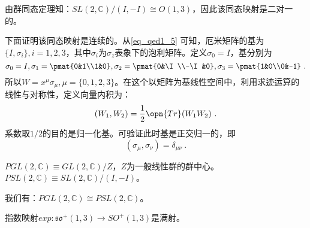 由群同态定理知：$SL(2,\mathbb C)/(I,-I)\cong O(1,3)$，因此该同态映射是二对一的。

下面证明该同态映射是连续的。从\autoref{eq_qed1_5} 可知，厄米矩阵的基为$\{I,\sigma_i\},i=1,2,3$，其中$\sigma_i$为$\sigma_z$表象下的泡利矩阵。定义$\sigma_0=I$，基分别为
\begin{equation}
\sigma_0=I,\sigma_1=\pmat{0&1\\1&0},\sigma_2=\pmat{0&\I\\-\I&0},\sigma_3=\pmat{1&0\\0&-1}~.
\end{equation}
所以$W=x^{\mu}\sigma_{\mu},\mu=\{0,1,2,3\}$。在这个以矩阵为基线性空间中，利用求迹运算的线性与对称性，定义向量内积为：
\begin{equation}
(W_1,W_2)=\frac{1}{2}\opn{Tr}(W_1W_2)~.
\end{equation}
系数取$1/2$的目的是归一化基。可验证此时基是正交归一的，即
\begin{equation}
(\sigma_{\mu},\sigma_{\nu})=\delta_{\mu\nu}~.
\end{equation}




\begin{lemma}{}
$PGL(2,\mathbb C)\equiv GL(2,\mathbb C)/Z$，$Z$为一般线性群的群中心。$PSL(2,\mathbb C)\equiv SL(2,\mathbb C)/(I,-I)$。

我们有：$PGL(2,\mathbb C)\cong PSL(2,\mathbb C)$。
\end{lemma}
\begin{theorem}{}
指数映射$exp:\mathfrak {so}^+(1,3)\to SO^+(1,3)$是满射。
\end{theorem}



